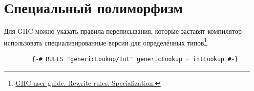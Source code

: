 \documentclass[12pt]{article}
\begin{document}








    \section{Специальный полиморфизм} \label{sec:ad-hoc}










    Для GHC можно указать правила переписывания, которые заставят компилятор использовать специализированные версии для определённых типов\footnote{\href{https://downloads.haskell.org/~ghc/6.12.2/docs/html/users\_guide/rewrite-rules.html\#rule-spec}{GHC user guide. Rewrite rules. Specialization.}}.
    \begin{verbatim}
        {-# RULES "genericLookup/Int" genericLookup = intLookup #-}
    \end{verbatim}
\end{document}
